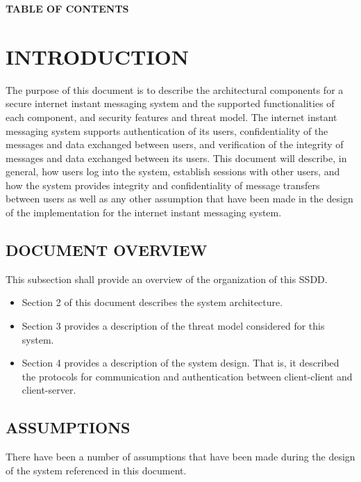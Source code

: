 \documentclass[twoside,letterpaper]{article}
\begin{document}
{\centering{}\bfseries\color{black}
TABLE OF CONTENTS
\par}

\setcounter{tocdepth}{9}
\renewcommand\contentsname{}
\tableofcontents

\bigskip

\bigskip
\clearpage\setcounter{page}{1}\pagestyle{Standard}
\section{INTRODUCTION}
The purpose of this document is to describe the architectural components for a secure internet instant 
messaging system and the supported functionalities of each component, and security features and threat model.
The internet instant messaging system supports authentication of its users, 
confidentiality of the messages and data exchanged between users, and 
verification of the integrity of messages and data exchanged between its users. 
This document will describe, in general, how users log into the system, establish
sessions with other users, and how the system provides integrity and confidentiality 
of message transfers between users as well as any other assumption that 
have been made in the design of the implementation for the internet instant 
messaging system.

\bigskip

\subsection{DOCUMENT OVERVIEW}
This subsection shall provide an overview of the organization of this
SSDD.

\begin{itemize}
\item Section 2 of this document describes the system architecture.
\item Section 3 provides a description of the threat model considered for this system.
\item Section 4 provides a description of the system design. That is, it described the protocols for communication
and authentication between client-client and client-server.
\end{itemize}

\bigskip

\subsection{ASSUMPTIONS}
There have been a number of assumptions that have been made during the design of the system referenced in this document.
\end{document}

